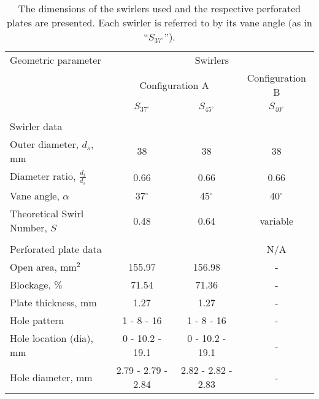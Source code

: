 \begin{table}
  \caption[Swirler dimensions]{The dimensions of the swirlers used and the respective perforated plates are presented. Each swirler is referred to by its vane angle (as in ``\(S_{37^\circ}\)'').}
  \begin{center}
    \begin{tabular}{lccc}
      Geometric parameter & \multicolumn{3}{c}{Swirlers}\tabularnewline
      & \multicolumn{2}{c}{Configuration A} & Configuration B\tabularnewline
      & \(S_{37^\circ}\) & \(S_{45^\circ}\) & \(S_{40^\circ}\)\tabularnewline
      \hline \hline
      & & &\tabularnewline
      Swirler data & & & \tabularnewline
      \hline
      Outer diameter, \(d_s\), mm & 38 & 38 & 38\tabularnewline
      Diameter ratio, \(\frac{d_i}{d_s}\) & 0.66 & 0.66 & 0.66\tabularnewline
      Vane angle, \(\alpha\) & 37\(^\circ\) & 45\(^\circ\) & 40\(^\circ\)\tabularnewline
      Theoretical Swirl Number, \(S\) & 0.48 & 0.64 & variable\tabularnewline
      & & &\tabularnewline
      Perforated plate data & & & N/A\tabularnewline
      \hline
      Open area, mm\(^2\) & 155.97 & 156.98 & -\tabularnewline
      Blockage, \% & 71.54 & 71.36 & -\tabularnewline
      Plate thickness, mm & 1.27 & 1.27 & - \tabularnewline
      Hole pattern & 1 - 8 - 16 & 1 - 8 - 16 & - \tabularnewline
      Hole location (dia), mm & 0 - 10.2 - 19.1 & 0 - 10.2 - 19.1 & -\tabularnewline
      Hole diameter, mm & 2.79 - 2.79 - 2.84 & 2.82 - 2.82 - 2.83 & -\tabularnewline
      \hline
    \end{tabular}
  \end{center}
  \label{tab:swirlerDimensions}
\end{table}

